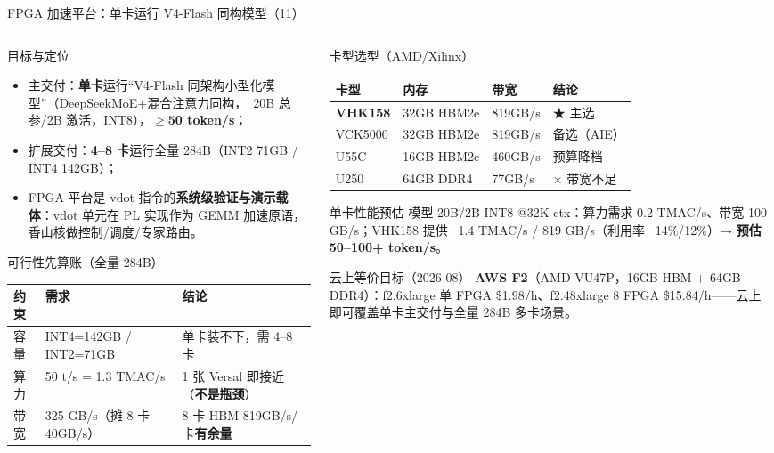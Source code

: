 \documentclass[aspectratio=169]{beamer}
\newcommand{\smalltable}[1]{\par\centering\scriptsize #1\par}
\begin{document}
\begin{frame}{FPGA 加速平台：单卡运行 V4-Flash 同构模型（11）}
\begin{columns}[T]
\begin{column}{0.52\textwidth}
\begin{block}{目标与定位}
\begin{itemize}\footnotesize
  \item 主交付：\textbf{单卡}运行“V4-Flash 同架构小型化模型”（DeepSeekMoE+混合注意力同构，~20B 总参/2B 激活，INT8），\textbf{$\ge$50 token/s}；
  \item 扩展交付：\textbf{4–8 卡}运行全量 284B（INT2 71GB / INT4 142GB）；
  \item FPGA 平台是 vdot 指令的\textbf{系统级验证与演示载体}：vdot 单元在 PL 实现作为 GEMM 加速原语，香山核做控制/调度/专家路由。
\end{itemize}
\end{block}
\begin{block}{可行性先算账（全量 284B）}
\smalltable{%
\begin{tabular}{@{}lll@{}}
\toprule
约束 & 需求 & 结论 \\
\midrule
容量 & INT4=142GB / INT2=71GB & 单卡装不下，需 4–8 卡 \\
算力 & 50 t/s = 1.3 TMAC/s & 1 张 Versal 即接近（\textbf{不是瓶颈}）\\
带宽 & 325 GB/s（摊 8 卡 40GB/s） & 8 卡 HBM 819GB/s/卡\textbf{有余量} \\
\bottomrule
\end{tabular}}
\end{block}
\end{column}
\begin{column}{0.46\textwidth}
\begin{block}{卡型选型（AMD/Xilinx）}
\smalltable{%
\begin{tabular}{@{}llll@{}}
\toprule
卡型 & 内存 & 带宽 & 结论 \\
\midrule
\textbf{VHK158} & 32GB HBM2e & 819GB/s & ★ 主选 \\
VCK5000 & 32GB HBM2e & 819GB/s & 备选（AIE）\\
U55C & 16GB HBM2e & 460GB/s & 预算降档 \\
U250 & 64GB DDR4 & 77GB/s & $\times$ 带宽不足 \\
\bottomrule
\end{tabular}}
\end{block}
\begin{block}{单卡性能预估}
\footnotesize 模型 20B/2B INT8 @32K ctx：算力需求 0.2 TMAC/s、带宽 100 GB/s；VHK158 提供 ~1.4 TMAC/s / 819 GB/s（利用率 ~14\%/12\%）→ \textbf{预估 50–100+ token/s}。
\end{block}
\begin{alertblock}{云上等价目标（2026-08）}
\footnotesize \textbf{AWS F2}（AMD VU47P，16GB HBM + 64GB DDR4）：f2.6xlarge 单 FPGA \$1.98/h、f2.48xlarge 8 FPGA \$15.84/h——云上即可覆盖单卡主交付与全量 284B 多卡场景。
\end{alertblock}
\end{column}
\end{columns}
\end{frame}
\end{document}
